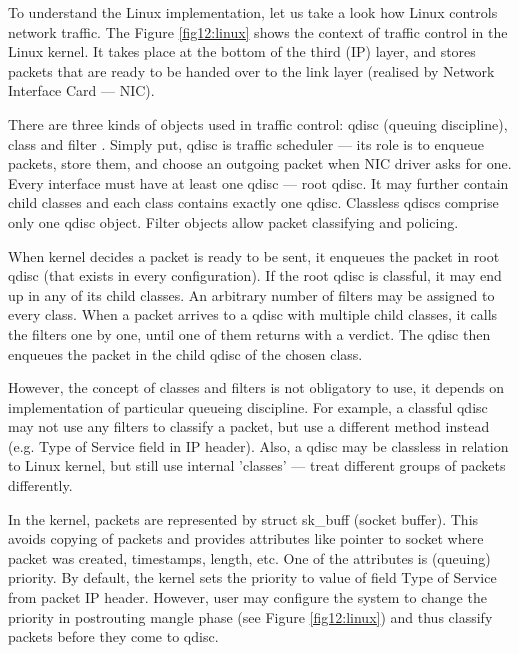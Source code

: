 To understand the Linux implementation, let us  take a look how Linux controls network traffic. The Figure \ref{fig12:linux} shows the context of traffic control in the Linux kernel. It takes place at the bottom of the third (IP) layer, and stores packets that are ready to be handed over to the link layer (realised by Network Interface Card --- NIC).


There are three kinds of objects used in traffic control: qdisc (queuing discipline), class and filter \cite{tc}. Simply put, qdisc is  traffic scheduler --- its role is to enqueue packets, store them, and choose an outgoing packet when NIC driver asks for one. Every interface must have at least one qdisc --- root qdisc. It may further contain child classes and each class contains exactly one qdisc. Classless qdiscs comprise only one qdisc object. Filter objects allow packet classifying and policing.

When kernel decides a packet is ready to be sent, it enqueues the packet in root qdisc (that exists in every configuration). If the root qdisc is classful, it may end up in any of its child classes. An arbitrary number of filters may be assigned to every class. When a packet arrives to a qdisc with multiple child classes, it calls the filters one by one, until one of them returns with a verdict. The qdisc then enqueues the packet in the child qdisc of the chosen class.

However, the concept of classes and filters is not obligatory to use, it depends on implementation of particular queueing discipline. For example, a classful qdisc may not use any filters to classify a packet, but use a different method instead (e.g. Type of Service field in IP header). Also, a qdisc may be classless in relation to Linux kernel, but still use internal 'classes' --- treat different groups of packets differently.


In the kernel, packets are represented by struct sk\_buff (socket buffer). This avoids copying of packets and provides attributes like pointer to socket where packet was created, timestamps, length, etc. One of the attributes is (queuing) priority. By default, the kernel sets the priority to value of field Type of Service from packet IP header. However, user may configure the system to change the priority in postrouting mangle phase (see Figure \ref{fig12:linux}) and thus classify packets before they come to qdisc.

